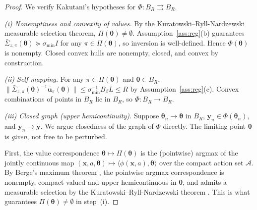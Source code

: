 \documentclass[11pt]{article}
\begin{document}
\begin{proof}
We verify Kakutani's hypotheses for $\Phi:B_R\rightrightarrows B_R$.

\emph{(i) Nonemptiness and convexity of values.}  By the
Kuratowski--Ryll-Nardzewski measurable selection theorem,
$\Pi(\bm{\theta})\neq\emptyset$.
Assumption~\ref{ass:reg}(b) guarantees
$\bar{\Sigma}_{z,\pi}(\bm{\theta})\succeq\sigma_{\min}I$
for any $\pi\in\Pi(\bm{\theta})$, so inversion is well-defined.
Hence $\Phi(\bm{\theta})$ is nonempty. Closed convex hulls are
nonempty, closed, and convex by construction.

\emph{(ii) Self-mapping.}  For any $\pi\in\Pi(\bm{\theta})$ and
$\bm{\theta}\in B_R$,
$\|\bar{\Sigma}_{z,\pi}(\bm{\theta})^{-1}\bar{\bm{u}}_\pi(\bm{\theta})\|
\leq\sigma_{\min}^{-1}B_\beta L\leq R$
by Assumption~\ref{ass:reg}(c).
Convex combinations of points in $B_R$ lie in $B_R$, so $\Phi:B_R\to B_R$.

\emph{(iii) Closed graph (upper hemicontinuity).}  Suppose
$\bm{\theta}_n\to\bm{\theta}$ in $B_R$, $\bm{y}_n\in\Phi(\bm{\theta}_n)$,
and $\bm{y}_n\to\bm{y}$.  We argue closedness of the graph of $\Phi$
directly. The limiting point $\bm{\theta}$ is \emph{given}, not free
to be perturbed.

First, the value correspondence
$\bm{\theta}\mapsto\Pi(\bm{\theta})$
is the (pointwise) argmax of the jointly continuous map
$(\bm{x},a,\bm{\theta})\mapsto\langle\phi(\bm{x},a),\bm{\theta}\rangle$
over the compact action set $\mathcal{A}$.  By Berge's maximum theorem
\citep[Thm.~17.31]{aliprantis2006}, the pointwise argmax correspondence
is nonempty, compact-valued and upper hemicontinuous in
$\bm{\theta}$, and admits a measurable selection by the
Kuratowski--Ryll-Nardzewski theorem \citep[Thm.~18.13]{aliprantis2006}.
This is what guarantees $\Pi(\bm{\theta})\neq\emptyset$ in step~(i).


\end{proof}
\end{document}
